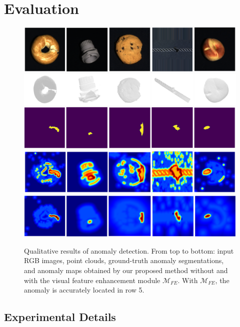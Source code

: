 \section*{Evaluation}
\label{sec:evaluation}

\begin{figure}[ht]
\centering
\includegraphics[width=\linewidth]{figs/result_rgb}
\includegraphics[width=\linewidth]{figs/result_pc}
\includegraphics[width=\linewidth]{figs/result_gt}
\includegraphics[width=\linewidth]{figs/result_baseline}
\includegraphics[width=\linewidth]{figs/result_ours}
\caption{Qualitative results of anomaly detection. From top to bottom: input RGB images, point clouds, ground-truth anomaly segmentations, and anomaly maps obtained by our proposed method without and with the visual feature enhancement module $\mathcal{M}_{FE}$. With $\mathcal{M}_{FE}$, the anomaly is accurately located in row 5.}
\label{fig:results}
\end{figure}

\subsection*{Experimental Details}

